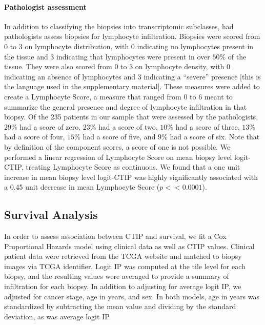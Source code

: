\documentclass[
]{book}
\begin{document}
\paragraph{\textbf{Pathologist assessment}}

In addition to classifying the biopsies into transcriptomic subclasses, \citet{Akbani15} had pathologists assess biopsies for lymphocyte infiltration. Biopsies were scored from 0 to 3 on lymphocyte distribution, with 0 indicating no lymphocytes present in the tissue and 3 indicating that lymphocytes were present in over \(50\%\) of the tissue. They were also scored from 0 to 3 on lymphocyte density, with 0 indicating an absence of lymphocytes and 3 indicating a ``severe'' presence {[}this is the language used in the supplementary material{]}. These measures were added to create a Lymphocyte Score, a measure that ranged from 0 to 6 meant to summarize the general presence and degree of lymphocyte infiltration in that biopsy. Of the 235 patients in our sample that were assessed by the pathologists, \(29\%\) had a score of zero, \(23\%\) had a score of two, \(10\%\) had a score of three, \(13\%\) had a score of four, \(15\%\) had a score of five, and \(9\%\) had a score of six. Note that by definition of the component scores, a score of one is not possible. We performed a linear regression of Lymphocyte Score on mean biopsy level logit-CTIP, treating Lymphocyte Score as continuous. We found that a one unit increase in mean biopsy level logit-CTIP was highly significantly associated with a 0.45 unit decrease in mean Lymphocyte Score (\(p << 0.0001\)).

\hypertarget{survival-analysis}{%
\subsection{Survival Analysis}\label{survival-analysis}}

In order to assess association between CTIP and survival, we fit a
Cox Proportional Hazards model using clinical data as well as CTIP
values. Clinical patient data were retrieved from the TCGA
website and matched to biopsy images via TCGA identifier. Logit
IP was computed at the tile level for each biopsy, and the
resulting values were averaged to provide a summary of
infiltration for each biopsy. In addition to adjusting for average
logit IP, we adjusted for cancer stage, age in years, and sex.
In both models, age in years was standardized
by subtracting the mean value and dividing by the standard deviation,
as was average logit IP.
\end{document}
